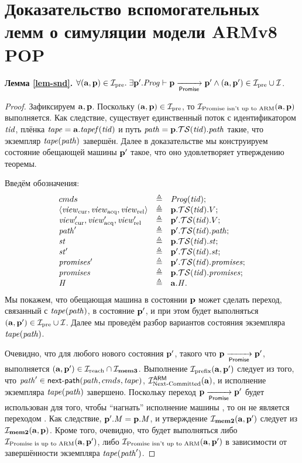 \chapter{Доказательство вспомогательных лемм о симуляции модели ARMv8 POP}
\label{sec:appendix-pop-proofs}

\noindent
\textbf{Лемма \ref{lem-snd}.}
$\forall (\aT, \p) \in \simrelPre. \;
\exists \p'. \Cfprom \vdash \p \promStep \p' \land (\aT, \p') \in \simrelPre \cup \simrel$.
\begin{proof}
Зафиксируем $\aT, \p$.
Поскольку $(\aT, \p) \in \simrelPre$, то $\invPromUptoARMnot(\aT, \p)$ выполняется.
Как следствие, существует единственный поток с идентификатором $\tId$, плёнка $\tape = \aT.\tapef(\tId)$ и
путь $\cpath = \p.\TSfprom(\tId).\cpath$ такие, что экземпляр $\tape(\cpath)$ завершён.
Далее в доказательстве мы конструируем состояние обещающей машины $\p'$ такое, что 
оно удовлетворяет утверждению теоремы.

Введём обозначения:
\[\begin{array}{l l l}
  \Carm & \triangleq & \Cfarm(\tId); \\
  \angled{\Rcur, \Racq, \Rrel} & \triangleq & \p.\TSfprom(\tId).\V; \\
  \Rcur', \Racq', \Rrel' & \triangleq & \p'.\TSfprom(\tId).\V;\\
  \cpath' & \triangleq & \p'.\TSfprom(\tId).\cpath;\\
  \PromState & \triangleq & \p.\TSfprom(\tId).\PromState;\\
  \PromState' & \triangleq & \p'.\TSfprom(\tId).\PromState;\\
  \PromSet' & \triangleq & \p'.\TSfprom(\tId).\PromSet;\\
  \PromSet & \triangleq & \p.\TSfprom(\tId).\PromSet;\\
  \hmap   & \triangleq & \aT.\hmap.
\end{array}\]
Мы покажем, что обещающая машина в состоянии $\p$ может сделать переход, связанный с $\tape(\cpath)$, в состояние $\p'$,
и при этом будет выполняться $(\aT, \p') \in \simrelPre \cup \simrel$.
Далее мы проведём разбор вариантов состояния экземпляра $\tape(\cpath)$.

Очевидно, что для любого нового состояния $\p'$, такого что $\p \promStep \p'$, выполняется 
$(\aT, \p') \in \invReach \cap \invMemThree$.
Выполнение $\invPrefix(\aT, \p')$ следует из того, что
  $\cpath' \in \nextPathCom{\cpath}{\Carm}{\tape}$, $\invAnextCommitted(\aT)$, и исполнение экземпляра $\tape(\cpath)$ завершено.
Поскольку переход $\p \promStep \p'$ будет использован для того, чтобы ``нагнать'' исполнение машины \ARMt,
то он не является переходом . Как следствие, $\p'.\Mprom = \p.\Mprom$, и 
утверждение $\invMemTwo(\aT, \p')$ следует из $\invMemTwo(\aT, \p)$.
Кроме того, очевидно, что будет выполняться
либо $\invPromUptoARM(\aT, \p')$, либо $\invPromUptoARMnot(\aT, \p')$ в зависимости от
завершённости экземпляра $\tape(\cpath')$.


\end{proof}
